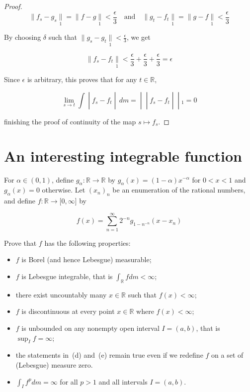 \documentclass{qlnotes-export}
\begin{document}
\begin{proof}
\[\parallel f_{s} - g_{s}\underset{1}{\parallel} = \parallel f - g\underset{1}{\parallel} < \frac{\epsilon}{3}\quad\text{and}\quad \parallel g_{t} - f_{t}\underset{1}{\parallel} = \parallel g - f\underset{1}{\parallel} < \frac{\epsilon}{3}\]

By choosing \(\delta\) such that \(\parallel g_{s} - g_{t}\underset{1}{\parallel} < \frac{\epsilon}{3}\), we get

\[\parallel f_{s} - f_{t}\underset{1}{\parallel} < \frac{\epsilon}{3} + \frac{\epsilon}{3} + \frac{\epsilon}{3} = \epsilon\]

Since \(\epsilon\) is arbitrary, this proves that for any \(t \in {\mathbb{R}}\),

\[\left. \lim\limits_{s\rightarrow t}\int \middle| f_{s} - f_{t} \middle| \, dm = \middle| \middle| f_{s} - f_{t} \middle| \middle| {}_{1} = 0 \right.\]

finishing the proof of continuity of the map \(s\mapsto f_{s}\).

\end{proof}

\section{An interesting integrable function}\label{an-interesting-integrable-function}

For \(\alpha \in (0,1)\), define \(g_{\alpha}:{\mathbb{R}}\rightarrow{\mathbb{R}}\) by \(g_{\alpha}(x) = (1 - \alpha)x^{- \alpha}\) for \(0 < x < 1\) and \(g_{\alpha}(x) = 0\) otherwise. Let \((x_{n})_{n}\) be an enumeration of the rational numbers, and define \(f:{\mathbb{R}}\rightarrow\lbrack 0,\infty\rbrack\) by

\[f(x) = \sum\limits_{n = 1}^{\infty}2^{- n}g_{1 - n^{- n}}(x - x_{n})\]

Prove that \(f\) has the following properties:

\begin{itemize}
\item
  \(f\) is Borel (and hence Lebesgue) measurable;
\item
  \(f\) is Lebesgue integrable, that is \(\int_{\mathbb{R}}f dm < \infty\);
\item
  there exist uncountably many \(x \in {\mathbb{R}}\) such that \(f(x) < \infty\);
\item
  \(f\) is discontinuous at every point \(x \in {\mathbb{R}}\) where \(f(x) < \infty\);
\item
  \(f\) is unbounded on any nonempty open interval \(I = (a,b)\), that is \(\sup_{I}f = \infty\);
\item
  the statements in~(d) and~(e) remain true even if we redefine \(f\) on a set of (Lebesgue) measure zero.
\item
  \(\int_{I}f^{p} dm = \infty\) for all \(p > 1\) and all intervals \(I = (a,b)\).
\end{itemize}
\end{document}
